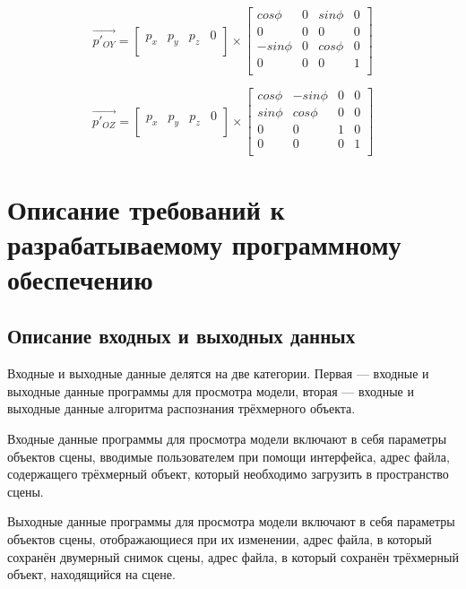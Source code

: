 \begin{equation}\label{rot_OY_mat} 
\overrightarrow{p'_{OY}} = 
\begin{bmatrix}
p_{x} & p_{y} & p_{z} & 0\\
\end{bmatrix}
\times
\begin{bmatrix}
cos \phi & 0 & sin \phi & 0\\
0 & 0 & 0 & 0\\
-sin \phi & 0 & cos \phi & 0\\
0 & 0 & 0 & 1\\
\end{bmatrix}
\end{equation}

\begin{equation}\label{rot_OZ_mat} 
\overrightarrow{p'_{OZ}} = 
\begin{bmatrix}
p_{x} & p_{y} & p_{z} & 0\\
\end{bmatrix}
\times
\begin{bmatrix}
cos \phi & -sin \phi & 0 & 0\\
sin \phi & cos \phi & 0 & 0\\
0 & 0 & 1 & 0\\
0 & 0 & 0 & 1\\
\end{bmatrix}
\end{equation}

\section{Описание требований к разрабатываемому программному обеспечению}
\subsection{Описание входных и выходных данных}
Входные и выходные данные делятся на две категории. Первая --- входные и выходные данные программы для просмотра модели, вторая --- входные и выходные данные алгоритма распознания трёхмерного объекта.

Входные данные программы для просмотра модели включают в себя параметры объектов сцены, вводимые пользователем при помощи интерфейса, адрес файла, содержащего трёхмерный объект, который необходимо загрузить в пространство сцены.

Выходные данные программы для просмотра модели включают в себя параметры объектов сцены, отображающиеся при их изменении, адрес файла, в который сохранён двумерный снимок сцены, адрес файла, в который сохранён трёхмерный объект, находящийся на сцене.

